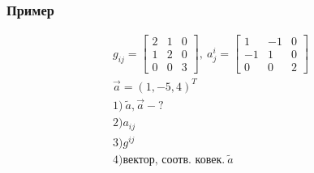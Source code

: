 \subsubsection{Пример}

$$\begin{gather}
g_{ij} = \begin{bmatrix}
2 & 1 & 0 \\
1 & 2 & 0 \\
0 & 0 & 3
\end{bmatrix}, \ a_{j}^{i} = \begin{bmatrix}
1 & -1 & 0 \\
-1 & 1 & 0 \\
0 & 0 & 2
\end{bmatrix} \\
\vec{a} = (1,-5,4)^{T} \\
1) \ \tilde{a}, \vec{a} - ? \\
2) a_{ij} \\
3) g^{ij} \\
4) \text{вектор, соотв. ковек.} \ \tilde{a}
\end{gather}$$

